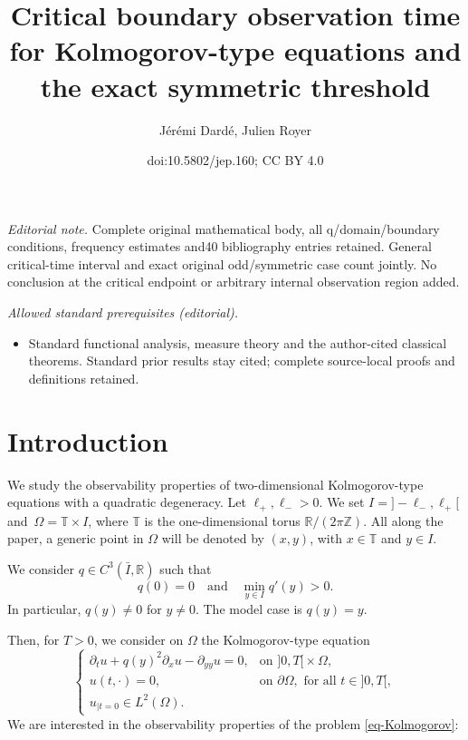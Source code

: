 \documentclass[10pt]{amsart}
\title{Critical boundary observation time for Kolmogorov-type equations and the exact symmetric threshold}
\author{Jérémi Dardé, Julien Royer}
\date{doi:10.5802/jep.160; CC BY 4.0}
\theoremstyle{plain}
\theoremstyle{definition}
\newcommand{\1}{\mathds 1}
\newcommand{\R}{\mathbb{R}}
\newcommand{\Z}{\mathbb{Z}}
\newcommand{\T}{\mathbb{T}}
\let\O\Omega
\begin{document}
\maketitle
\noindent\textit{Editorial note.} Complete original mathematical body, all q/domain/boundary conditions, frequency estimates and40 bibliography entries retained. General critical-time interval and exact original odd/symmetric case count jointly. No conclusion at the critical endpoint or arbitrary internal observation region added.\par\medskip
\noindent\textit{Allowed standard prerequisites (editorial).}\begin{itemize}
\item Standard functional analysis, measure theory and the author-cited classical theorems. Standard prior results stay cited; complete source-local proofs and definitions retained.
\end{itemize}\medskip
\vspace*{-\baselineskip}\enlargethispage{\baselineskip}%
\tableofcontents


\section{Introduction}

We study the observability properties of two-dimensional Kolmogorov-type equations with a quadratic degeneracy. Let $\ell_+, \ell_- >0$. We set $I ={} ]-\ell_-,\ell_+[$ and~$\O = \T \times I$, where $\T$ is the one-dimensional torus $\R / (2 \pi \Z)$. All along the paper, a generic point in $\O$ will be denoted by $(x,y)$, with $x \in \T$ and $y \in I$.

We consider $q \in C^3 (\bar I,\R)$ such that
\[
q(0) = 0 \quad \text{and} \quad \min_{y \in I} q'(y) > 0.
\]
In particular, $q(y) \neq 0$ for $y \neq 0$. The model case is $q(y) = y$.

Then, for $T > 0$, we consider on $\O$ the Kolmogorov-type equation
\begin{equation} \label{eq-Kolmogorov}
\begin{cases}
\partial_t u + q(y)^2 \partial_x u - \partial_{yy} u = 0, & \text{on } ]0,T[{}\times \O,\\
u(t,\cdot) = 0, & \text{on } \partial\O, \text{ for all } t \in{}]0,T[,\\
u_{|t=0} \in L^2 (\O).
\end{cases}
\end{equation}
We are interested in the observability properties of the problem \eqref{eq-Kolmogorov}:
\end{document}
